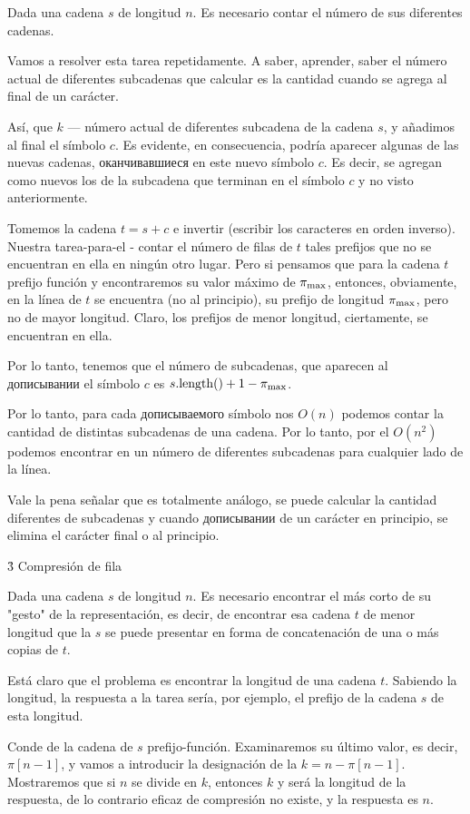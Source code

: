 Dada una cadena $s$ de longitud $n$. Es necesario contar el número de sus diferentes cadenas.

Vamos a resolver esta tarea repetidamente. A saber, aprender, saber el número actual de diferentes subcadenas que calcular es la cantidad cuando se agrega al final de un carácter.

Así, que $k$ --- número actual de diferentes subcadena de la cadena $s$, y añadimos al final el símbolo $c$. Es evidente, en consecuencia, podría aparecer algunas de las nuevas cadenas, оканчивавшиеся en este nuevo símbolo $c$. Es decir, se agregan como nuevos los de la subcadena que terminan en el símbolo $c$ y no visto anteriormente.

Tomemos la cadena $t = s + c$ e invertir (escribir los caracteres en orden inverso). Nuestra tarea-para-el - contar el número de filas de $t$ tales prefijos que no se encuentran en ella en ningún otro lugar. Pero si pensamos que para la cadena $t$ prefijo función y encontraremos su valor máximo de $\pi_{\rm max}$, entonces, obviamente, en la línea de $t$ se encuentra (no al principio), su prefijo de longitud $\pi_{\rm max}$, pero no de mayor longitud. Claro, los prefijos de menor longitud, ciertamente, se encuentran en ella.

Por lo tanto, tenemos que el número de subcadenas, que aparecen al дописывании el símbolo $c$ es $s.{\rm length}() + 1 - \pi_{\rm max}$.

Por lo tanto, para cada дописываемого símbolo nos $O(n)$ podemos contar la cantidad de distintas subcadenas de una cadena. Por lo tanto, por el $O(n^2)$ podemos encontrar en un número de diferentes subcadenas para cualquier lado de la línea.

Vale la pena señalar que es totalmente análogo, se puede calcular la cantidad diferentes de subcadenas y cuando дописывании de un carácter en principio, se elimina el carácter final o al principio.


\h3{ Compresión de fila }

Dada una cadena $s$ de longitud $n$. Es necesario encontrar el más corto de su "gesto" de la representación, es decir, de encontrar esa cadena $t$ de menor longitud que la $s$ se puede presentar en forma de concatenación de una o más copias de $t$.

Está claro que el problema es encontrar la longitud de una cadena $t$. Sabiendo la longitud, la respuesta a la tarea sería, por ejemplo, el prefijo de la cadena $s$ de esta longitud.

Conde de la cadena de $s$ prefijo-función. Examinaremos su último valor, es decir, $\pi[n-1]$, y vamos a introducir la designación de la $k = n - \pi[n-1]$. Mostraremos que si $n$ se divide en $k$, entonces $k$ y será la longitud de la respuesta, de lo contrario eficaz de compresión no existe, y la respuesta es $n$.

